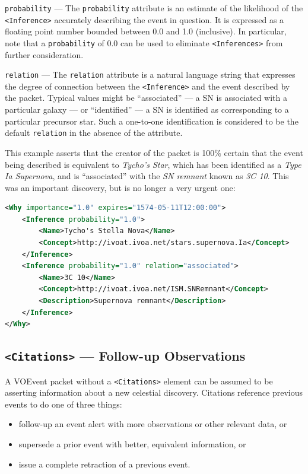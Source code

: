 \documentclass[11pt,a4paper]{ivoa}
\begin{document}
 {\tt probability}\label{sec:3.6.6.1} --- The {\tt probability} attribute is an estimate of the likelihood of the {\tt <Inference>} accurately describing the event in question. It is expressed as a floating point number bounded between 0.0 and 1.0 (inclusive). In particular, note that a {\tt probability} of 0.0 can be used to eliminate {\tt <Inferences>} from further consideration. 

 {\tt relation}\label{sec:3.6.6.2} --- The {\tt relation} attribute is a natural language string that expresses the degree of connection between the {\tt <Inference>} and the event described by the packet. Typical values might be ``associated'' --- a SN is associated with a particular galaxy --- or ``identified'' --- a SN is identified as corresponding to a particular precursor star. Such a one-to-one identification is considered to be the default {\tt relation} in the absence of the attribute. 

This example asserts that the creator of the packet is 100\% certain that the event being described is equivalent to \emph{Tycho's Star}, which has been identified as a \emph{Type Ia Supernova}, and is ``associated'' with the \emph{SN remnant} known as \emph{3C 10}. This was an important discovery, but is no longer a very urgent one: 
\begin{lstlisting}[language=XML]
<Why importance="1.0" expires="1574-05-11T12:00:00">
    <Inference probability="1.0">
        <Name>Tycho's Stella Nova</Name>
        <Concept>http://ivoat.ivoa.net/stars.supernova.Ia</Concept>
    </Inference>     
    <Inference probability="1.0" relation="associated">
        <Name>3C 10</Name>
        <Concept>http://ivoat.ivoa.net/ISM.SNRemnant</Concept>
        <Description>Supernova remnant</Description>
    </Inference>
</Why> 
\end{lstlisting}

\subsection{{\tt <Citations>} --- Follow-up Observations}
\label{sec:3.7}
A VOEvent packet without a {\tt <Citations>} element can be assumed to be asserting information about a new celestial discovery. Citations reference previous events to do one of three things: 
\begin{itemize}
\item follow-up an event alert with more observations or other relevant data, or
\item supersede a prior event with better, equivalent information, or
\item issue a complete retraction of a previous event.
\end{itemize}
\end{document}

